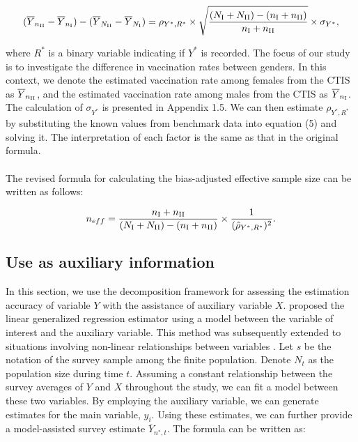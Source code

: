 \documentclass{article}
\begin{document}
\begin{align}
    (\overline{Y}_{n_{\rm II}} - \overline{Y}_{n_{\rm I}}) - (\overline{Y}_{N_{\rm II}} - \overline{Y}_{N_{\rm I}}) = {\rho}_{Y^{*}, R^{*}} \times \sqrt{\frac{(N_{\rm I} + N_{\rm II}) - (n_{\rm I} + n_{\rm II})}{n_{\rm I} + n_{\rm II}}} \times \sigma_{Y^{*}},
\end{align}

\noindent where $R^{*}$ is a binary variable indicating if $Y^{*}$ is recorded. The focus of our study is to investigate the difference in vaccination rates between genders. In this context, we denote the estimated vaccination rate among females from the CTIS as $\overline{Y}_{n_{\rm II}}$, and the estimated vaccination rate among males from the CTIS as $\overline{Y}_{n_{\rm I}}$. The calculation of $\sigma_{Y^{*}}$ is presented in Appendix 1.5. We can then estimate ${\rho}_{Y^{*}, R^{*}}$ by substituting the known values from benchmark data into equation (5) and solving it. The interpretation of each factor is the same as that in the original formula. 
\\
\\
The revised formula for calculating the bias-adjusted effective sample size can be written as follows: 

\begin{align}
    n_{eff} = \frac{n_{\rm I} + n_{\rm II}}{(N_{\rm I} + N_{\rm II}) - (n_{\rm I} + n_{\rm II})} \times \frac{1}{(\hat{\rho}_{Y^{*}, R^{*}})^2}.
\end{align}

\subsection{Use as auxiliary information}

In this section, we use the decomposition framework for assessing the estimation accuracy of variable $Y$ with the assistance of auxiliary variable $X$. \cite{Deville1992} proposed the linear generalized regression estimator using a model between the variable of interest and the auxiliary variable. This method was subsequently extended to situations involving non-linear relationships between variables \citep{Firth1998}. Let $s$ be the notation of the survey sample among the finite population. Denote $N_t$ as the population size during time $t$. Assuming a constant relationship between the survey averages of $Y$ and $X$ throughout the study, we can fit a model between these two variables. By employing the auxiliary variable, we can generate estimates for the main variable, $\hat{y}_i$. Using these estimates, we can further provide a model-assisted survey estimate $\overline{Y}_{n^{*},t}$. The formula can be written as:
\end{document}
